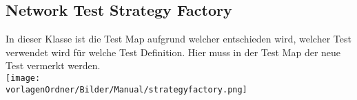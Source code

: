 \documentclass[
	ngerman,
	toc=listof, %
	toc=bibliography, %
	footnotes=multiple, %
	parskip=half, %
	numbers=noendperiod %
]{scrartcl}
\newcommand{\vorlagenOrdner}{../99_Vorlagen} %
\begin{document}
	\subsection{Network Test Strategy Factory}
		In dieser Klasse ist die Test Map aufgrund welcher entschieden wird, welcher Test verwendet wird für welche Test Definition.
		Hier muss in der Test Map der neue Test vermerkt werden.\\
		\texttt{[image: \\vorlagenOrdner/Bilder/Manual/strategyfactory.png]}
\end{document}
